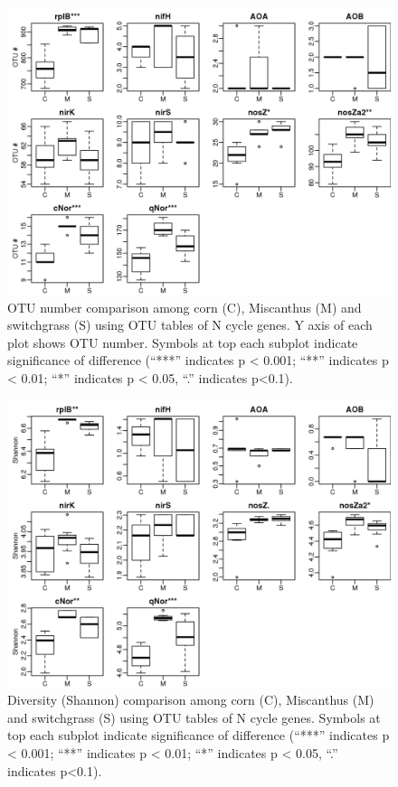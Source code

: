 \documentclass[]{msu-thesis}
\begin{document}
\begin{figure}[tbph!]
  \centering
  \includegraphics[scale=1]{figs/chap4-xander-ncycle-otu-count}
  \caption[N cycle gene OTU number comparison among three crops]{OTU number comparison among corn (C), Miscanthus (M) and switchgrass (S) using OTU tables of N cycle genes. Y axis of each plot shows OTU number. Symbols at top each subplot indicate significance of difference (``***'' indicates p < 0.001; ``**'' indicates p < 0.01; ``*'' indicates p < 0.05, ``.'' indicates p<0.1).}
  \label{fig:chap4FigS6}
\end{figure}


\begin{figure}[tbph!]
  \centering
  \includegraphics[scale=1]{figs/chap4-xander-ncycle-otu-shannon}
  \caption[N cycle gene diversity of three crops]{Diversity (Shannon) comparison among corn (C), Miscanthus (M) and switchgrass (S) using OTU tables of N cycle genes. Symbols at top each subplot indicate significance of difference (``***'' indicates p < 0.001; ``**'' indicates p < 0.01; ``*'' indicates p < 0.05, ``.'' indicates p<0.1).}
  \label{fig:chap4FigS7}
\end{figure}
\end{document}
